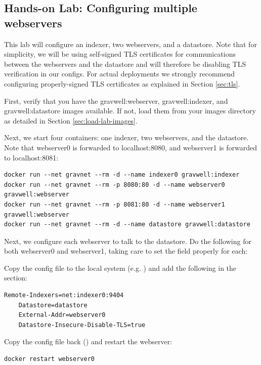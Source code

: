 \subsection{Hands-on Lab: Configuring multiple webservers}

This lab will configure an indexer, two webservers, and a datastore. Note that for
simplicity, we will be using self-signed TLS certificates for communications between
the webservers and the datastore and will therefore be disabling TLS verification in
our configs. For actual deployments we strongly recommend configuring properly-signed
TLS certificates as explained in Section \ref{sec:tls}.

First, verify that you have the gravwell:webserver, gravwell:indexer, and gravwell:datastore
images available. If not, load them from your images directory as detailed in
Section \ref{sec:load-lab-images}.

Next, we start four containers: one indexer, two webservers, and the
datastore. Note that webserver0 is forwarded to localhost:8080, and
webserver1 is forwarded to localhost:8081:

\begin{Verbatim}[breaklines=true]
docker run --net gravnet --rm -d --name indexer0 gravwell:indexer
docker run --net gravnet --rm -p 8080:80 -d --name webserver0 gravwell:webserver
docker run --net gravnet --rm -p 8081:80 -d --name webserver1 gravwell:webserver
docker run --net gravnet --rm -d --name datastore gravwell:datastore
\end{Verbatim}

Next, we configure each webserver to talk to the datastore. Do the
following for both webserver0 and webserver1, taking care to set the
 field properly for each:

Copy the config file to the local system
(e.g. )
and add the following in the \code{[Global]} section:

\begin{Verbatim}[breaklines=true]
    Remote-Indexers=net:indexer0:9404
    Datastore=datastore
    External-Addr=webserver0
    Datastore-Insecure-Disable-TLS=true
\end{Verbatim}

Copy the config file back ()
and restart the webserver:

\begin{Verbatim}[breaklines=true]
docker restart webserver0
\end{Verbatim}

